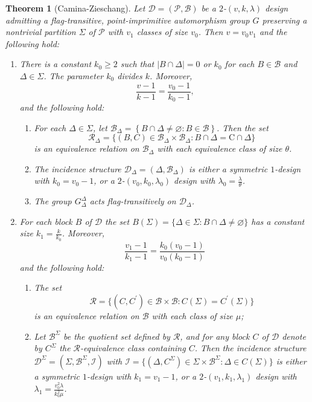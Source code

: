 \documentclass[a4paper,twopage,reqno,12pt]{amsart}
\newtheorem{theorem}{Theorem}[section]
\theoremstyle{definition}
\numberwithin{equation}{section}
\newcommand{\C}{\mathrm{C}}
\renewcommand{\geq}{\geqslant}
\begin{document}
\begin{theorem}[Camina-Zieschang]\label{CamZie}
Let $\mathcal{D}=(\mathcal{P}, \mathcal{B})$ be a $2$-$(v,k,\lambda)$ design admitting a
flag-transitive, point-imprimitive automorphism group $G$ preserving a nontrivial 
partition $\Sigma $ of $\mathcal{P}$ with $v_1$ classes of size $v_0$. Then $v=v_{0}v_{1}$ and the following hold:
\begin{enumerate}
    \item[(1)] There is a constant $k_0 \geq 2$ such that $\left\vert B\cap \Delta \right\vert =0$ or $%
k_0 $ for each $B\in \mathcal{B}$ and $\Delta \in \Sigma $. The parameter $k_0 $ divides $k$. Moreover,
\begin{equation}\label{rel1}
\frac{v-1}{k-1}=\frac{v_{0}-1}{k_{0}-1}\text{,}    
\end{equation}
and the following hold:
\begin{enumerate}
\item[(i)] For each $\Delta \in \Sigma $, let $\mathcal{B}_{\Delta }=\left\{ B\cap \Delta
\neq \varnothing :B\in \mathcal{B}\right\} $. Then the set $$\mathcal{R}_{\Delta}=\{(B,C) \in \mathcal{B}_{\Delta } \times \mathcal{B}_{\Delta }:  B\cap \Delta =\C\cap \Delta \}$$ is an equivalence relation on $\mathcal{B}_{\Delta }$ with each equivalence class of size $\theta$.
\item[(ii)] The incidence structure $\mathcal{D}_{\Delta }=(\Delta ,%
\mathcal{B}_{\Delta })$ is either a symmetric $1$-design with $k_{0}=v_{0}-1$, or a $2$-$(v_0,k_0 ,\lambda
_{0})$ design with $\lambda_{0}=\frac{\lambda}{\theta}$.
\item[(iii)] The group $G_{\Delta}^{\Delta}$ acts flag-transitively on $\mathcal{D}_{\Delta }$.
\end{enumerate}
\item[(2)] For each block $B$ of $\mathcal{D}$ the set $B(\Sigma)=\{\Delta \in \Sigma: B \cap \Delta \neq \varnothing\}$ has a constant size $k_{1}=\frac{k}{k_{0}}$. Moreover, 
\begin{equation}\label{rel2}
\frac{v_{1}-1}{k_{1}-1}=\frac{k_{0}(v_{0}-1)}{v_{0}(k_{0}-1)}    
\end{equation}
and the following hold:
\begin{enumerate}
\item[(i)] The set $$\mathcal{R}=\{(C,C^{\prime}) \in \mathcal{B} \times \mathcal{B}:C(\Sigma)=C^{\prime}(\Sigma)\}$$ is an equivalence relation on $\mathcal{B}$ with each class of size $\mu$;
\item[(ii)] Let $\mathcal{B}^{\Sigma}$ be the quotient set defined by $\mathcal{R}$, and for any block $C$ of $\mathcal{D}$ denote by $C^{\Sigma}$ the $\mathcal{R}$-equivalence class containing $C$. Then the incidence structure $\mathcal{D}^{\Sigma}=\left(\Sigma, \mathcal{B}^{\Sigma}, \mathcal{I} \right)$ with $\mathcal{I}=\{(\Delta,C^{\Sigma}) \in \Sigma \times \mathcal{B}^{\Sigma}: \Delta \in C(\Sigma) \}$ is either a symmetric $1$-design with $k_{1}=v_{1}-1$, or a $2$-$(v_{1},k_{1} ,\lambda_{1})$ design with $\lambda_{1}=\frac{v_{0}^{2}\lambda}{k_{0}^{2}\mu}$.

\end{enumerate}
\end{enumerate}
\end{theorem}
\end{document}
